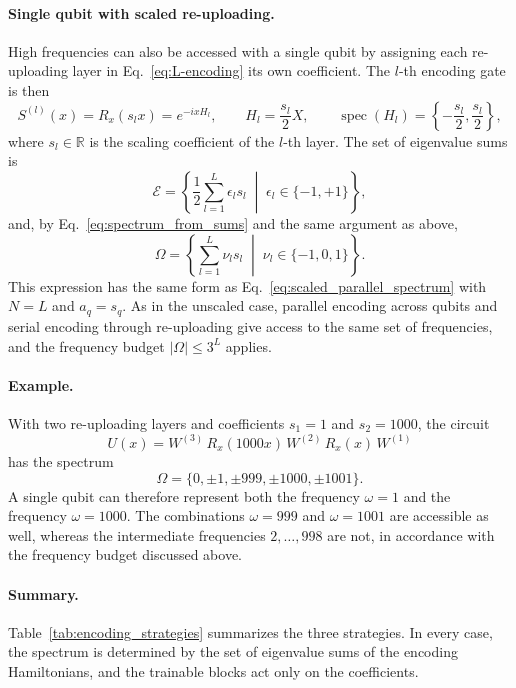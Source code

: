 \documentclass[12pt]{article}
\numberwithin{equation}{section}  %
\begin{document}
\paragraph{Single qubit with scaled re-uploading.} High frequencies can also be accessed with a single qubit by assigning each re-uploading layer in Eq.~\eqref{eq:L-encoding} its own coefficient. The $l$-th encoding gate is then
\begin{equation}
S^{(l)}(x) = R_x(s_l x) = e^{-ixH_l}, \qquad H_l = \frac{s_l}{2}X, \qquad
\operatorname{spec}(H_l) = \left\{ -\frac{s_l}{2}, \frac{s_l}{2} \right\},
\end{equation}
where $s_l \in \mathbb{R}$ is the scaling coefficient of the $l$-th layer. The set of eigenvalue sums is
\begin{equation}
\mathcal{E} = \left\{ \frac{1}{2}\sum_{l=1}^{L} \epsilon_l s_l \;\middle|\; \epsilon_l \in \{-1, +1\} \right\},
\end{equation}
and, by Eq.~\eqref{eq:spectrum_from_sums} and the same argument as above,
\begin{equation}
\Omega = \left\{ \sum_{l=1}^{L} \nu_l s_l \;\middle|\; \nu_l \in \{-1, 0, 1\} \right\}.
\end{equation}
This expression has the same form as Eq.~\eqref{eq:scaled_parallel_spectrum} with $N = L$ and $a_q = s_q$. As in the unscaled case, parallel encoding across qubits and serial encoding through re-uploading give access to the same set of frequencies, and the frequency budget $|\Omega| \le 3^L$ applies.

\paragraph{Example.} With two re-uploading layers and coefficients $s_1 = 1$ and $s_2 = 1000$, the circuit
\begin{equation}
U(x) = W^{(3)}\, R_x(1000x)\, W^{(2)}\, R_x(x)\, W^{(1)}
\end{equation}
has the spectrum
\begin{equation}
\Omega = \{0, \pm 1, \pm 999, \pm 1000, \pm 1001\}.
\end{equation}
A single qubit can therefore represent both the frequency $\omega = 1$ and the frequency $\omega = 1000$. The combinations $\omega = 999$ and $\omega = 1001$ are accessible as well, whereas the intermediate frequencies $2, \ldots, 998$ are not, in accordance with the frequency budget discussed above.

\paragraph{Summary.} Table~\ref{tab:encoding_strategies} summarizes the three strategies. In every case, the spectrum is determined by the set of eigenvalue sums of the encoding Hamiltonians, and the trainable blocks act only on the coefficients.
\end{document}
